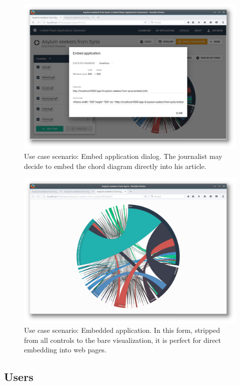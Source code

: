 \begin{figure}
	\centering
	\includegraphics[width=145mm]{img/05_scenario_10_embed_application}
	\caption{Use case scenario: Embed application dialog. The journalist may decide to embed the chord diagram directly into his article.}
    \label{fig:scenario-10-embed-application}
\end{figure}

\begin{figure}
	\centering
	\includegraphics[width=145mm]{img/05_scenario_11_embedded_application}
	\caption{Use case scenario: Embedded application. In this form, stripped from all controls to the bare visualization, it is perfect for direct embedding into web pages.}
    \label{fig:scenario-11-embedded-application}
\end{figure}


\subsection{Users}

